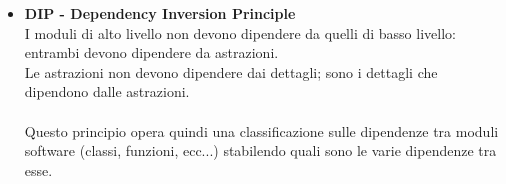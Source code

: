 \documentclass{article}
\begin{document}
\begin{itemize}
\item \textbf{\textcolor{blu}{DIP - Dependency Inversion Principle}}\\I moduli di alto livello non devono dipendere da quelli di basso livello: entrambi devono dipendere da astrazioni.\\Le astrazioni non devono dipendere dai dettagli; sono i dettagli che dipendono dalle astrazioni.\\ \\Questo principio opera quindi una classificazione sulle dipendenze tra moduli software (classi, funzioni, ecc...) stabilendo quali sono le varie dipendenze tra esse.
\end{itemize}
\end{document}
